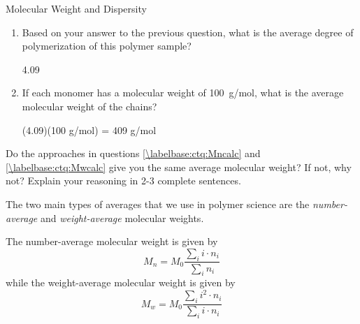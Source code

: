 \begin{activity}{Molecular Weight and Dispersity}
\begin{ctqs}
\begin{enumerate}
\begin{solution}[1.5in]
				\end{solution}
			
			\item Based on your answer to the previous question, what is the average degree of polymerization of this polymer sample?
			
				\begin{solution}[0.75in]
					4.09
				\end{solution}
				
			\item If each monomer has a molecular weight of 100~g/mol, what is the average molecular weight of the chains?
			
				\begin{solution}[1in]
					(4.09)(100 g/mol) = 409 g/mol
				\end{solution}
				
		\end{enumerate}
		
	\question Do the approaches in questions \ref{\labelbase:ctq:Mncalc} and \ref{\labelbase:ctq:Mwcalc} give you the same average molecular weight?  If not, why not?  Explain your reasoning in 2-3 complete sentences.
	
		\begin{solution}[3.25in]\end{solution}
		
\end{ctqs}

\begin{infobox}
\label{\labelbase:infobox:MnMw}
	
	The two main types of averages that we use in polymer science are the \emph{number-average} and \emph{weight-average} molecular weights.
	
	The number-average molecular weight is given by
	\begin{equation*}
		M_n = M_0 \frac{\sum_i i \cdot n_i}{\sum_i n_i}
	\end{equation*}
	while the weight-average molecular weight is given by
	\begin{equation*}
		M_w = M_0 \frac{\sum_i i^2 \cdot n_i}{\sum_i i\cdot n_i}
	\end{equation*}
	

\end{infobox}
\end{activity}
